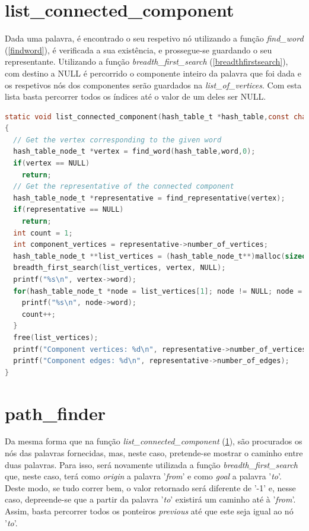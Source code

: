 	\section{list\_connected\_component}
	\label{listconnectedcomponent}
Dada uma palavra, é encontrado o seu respetivo nó utilizando a função \textit{find\_word} (\ref{findword}), é verificada a sua existência,
e prossegue-se guardando o seu representante. Utilizando a função \textit{breadth\_first\_search} (\ref{breadthfirstsearch}), com destino a NULL é percorrido o componente inteiro da palavra que foi dada e os respetivos nós dos componentes serão guardados na \textit{list\_of\_vertices}. Com esta lista basta percorrer todos os índices até o valor de um deles ser NULL.

	\begin{lstlisting}[language=C]
	static void list_connected_component(hash_table_t *hash_table,const char *word)
{
  // Get the vertex corresponding to the given word
  hash_table_node_t *vertex = find_word(hash_table,word,0);
  if(vertex == NULL)
    return;
  // Get the representative of the connected component
  hash_table_node_t *representative = find_representative(vertex);
  if(representative == NULL)
    return;
  int count = 1;
  int component_vertices = representative->number_of_vertices;
  hash_table_node_t **list_vertices = (hash_table_node_t**)malloc(sizeof(hash_table_node_t) * component_vertices);
  breadth_first_search(list_vertices, vertex, NULL);
  printf("%s\n", vertex->word);
  for(hash_table_node_t *node = list_vertices[1]; node != NULL; node = list_vertices[count]){
    printf("%s\n", node->word);
    count++;
  }
  free(list_vertices);
  printf("Component vertices: %d\n", representative->number_of_vertices);
  printf("Component edges: %d\n", representative->number_of_edges);
}
	\end{lstlisting}
	
	\section{path\_finder}
	\label{pathfinder}
Da mesma forma que na função \textit{list\_connected\_component} (\ref{listconnectedcomponent}), são procurados os nós das palavras fornecidas, mas, neste caso, pretende-se mostrar o caminho entre duas palavras. Para isso, será novamente utilizada a função \textit{breadth\_first\_search} 
que, neste caso, terá como \textit{origin} a palavra '\textit{from}' e como \textit{goal} a palavra '\textit{to}'. Deste modo, se tudo correr bem, o valor retornado 
será diferente de '-1' e, nesse caso, depreende-se que a partir da palavra '\textit{to}' existirá um caminho até à '\textit{from}'.
Assim, basta percorrer todos os ponteiros \textit{previous} até que este seja igual ao nó '\textit{to}'.	

